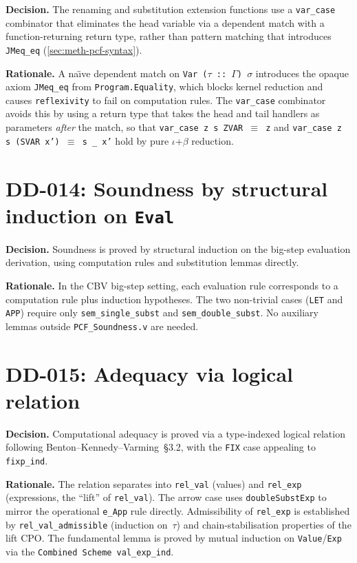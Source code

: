 \textbf{Decision.}
The renaming and substitution extension functions use a
\texttt{var\_case} combinator that eliminates the head variable via a
dependent match with a function-returning return type, rather than
pattern matching that introduces \texttt{JMeq\_eq}
(\cref{sec:meth-pcf-syntax}).

\textbf{Rationale.}
A na\"{\i}ve dependent match on \texttt{Var\,($\tau$\,::\,$\Gamma$)\,$\sigma$}
introduces the opaque axiom \texttt{JMeq\_eq} from
\texttt{Program.Equality}, which blocks kernel reduction and causes
\texttt{reflexivity} to fail on computation rules.  The
\texttt{var\_case} combinator avoids this by using a return type that
takes the head and tail handlers as parameters \emph{after} the match,
so that \texttt{var\_case\,z\,s\,ZVAR $\equiv$ z} and
\texttt{var\_case\,z\,s\,(SVAR\,x') $\equiv$ s\,\_\,x'} hold by pure
$\iota$+$\beta$ reduction.

\section*{DD-014: Soundness by structural induction on \texttt{Eval}}

\textbf{Decision.}
Soundness is proved by structural induction on the big-step evaluation
derivation, using computation rules and substitution lemmas directly.

\textbf{Rationale.}
In the CBV big-step setting, each evaluation rule corresponds to a
computation rule plus induction hypotheses.  The two non-trivial cases
(\texttt{LET} and \texttt{APP}) require only \texttt{sem\_single\_subst}
and \texttt{sem\_double\_subst}.  No auxiliary lemmas outside
\texttt{PCF\_Soundness.v} are needed.

\section*{DD-015: Adequacy via logical relation}

\textbf{Decision.}
Computational adequacy is proved via a type-indexed logical relation
following Benton--Kennedy--Varming~\S3.2, with the
\texttt{FIX} case appealing to \texttt{fixp\_ind}.

\textbf{Rationale.}
The relation separates into \texttt{rel\_val} (values) and
\texttt{rel\_exp} (expressions, the ``lift'' of \texttt{rel\_val}).  The
arrow case uses \texttt{doubleSubstExp} to mirror the operational
\texttt{e\_App} rule directly.  Admissibility of \texttt{rel\_exp} is
established by \texttt{rel\_val\_admissible} (induction on~$\tau$) and
chain-stabilisation properties of the lift CPO.  The fundamental lemma
is proved by mutual induction on \texttt{Value}/\texttt{Exp} via the
\texttt{Combined Scheme val\_exp\_ind}.

